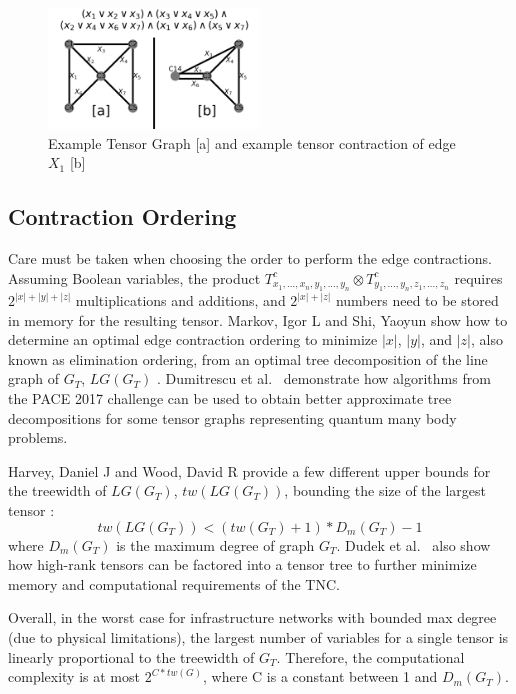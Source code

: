 \begin{figure}[t]
\caption{Example Tensor Graph [a] and example tensor contraction of edge $X_1$ [b]}
\label{fig:Tensor Graph Example}
\includegraphics[width=0.5\textwidth]{../figures/TensorGraphExample.png}
\end{figure}

\hypertarget{contraction-ordering}{%
\subsection{Contraction Ordering}\label{contraction-ordering}}

Care must be taken when choosing the order to perform the edge contractions. Assuming Boolean variables, the product \(T^c_{x_1,...,x_n,y_1,...,y_n} \otimes T^c_{y_1,...,y_n,z_1,...,z_n}\) requires \(2^{|x|+|y|+|z|}\) multiplications and additions, and \(2^{|x|+|z|}\) numbers need to be stored in memory for the resulting tensor. Markov, Igor L and Shi, Yaoyun show how to determine an optimal edge contraction ordering to minimize \(|x|\), \(|y|\), and \(|z|\), also known as elimination ordering, from an optimal tree decomposition of the line graph of \(G_T\), \(LG(G_T)\) \cite{markov2008simulating}. Dumitrescu et al.~\cite{dumitrescu2018benchmarking} demonstrate how algorithms from the PACE 2017 challenge \cite{dell2018pace} can be used to obtain better approximate tree decompositions for some tensor graphs representing quantum many body problems.

Harvey, Daniel J and Wood, David R provide a few different upper bounds for the treewidth of \(LG(G_T)\), \(tw(LG(G_T))\), bounding the size of the largest tensor \cite{harvey2018treewidth}: \begin{equation*}
tw(LG(G_T))<(tw(G_T)+1)*D_m(G_T)-1
\end{equation*} where \(D_m(G_T)\) is the maximum degree of graph \(G_T\). Dudek et al.~\cite{dudek2019efficient} also show how high-rank tensors can be factored into a tensor tree to further minimize memory and computational requirements of the TNC.

Overall, in the worst case for infrastructure networks with bounded max degree (due to physical limitations), the largest number of variables for a single tensor is linearly proportional to the treewidth of \(G_T\). Therefore, the computational complexity is at most \(2^{C*tw(G)}\), where C is a constant between 1 and \(D_m(G_T)\).

